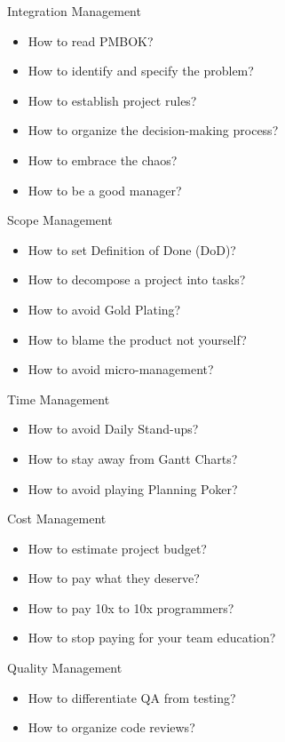 \documentclass[nobrand,anonymous,nodate,nosecurity]{huawei}
\begin{document}
{
\begin{lectures}
\item Integration Management
    \begin{itemize}
    \item How to read PMBOK?
    \item How to identify and specify the problem?
    \item How to establish project rules?
    \item How to organize the decision-making process?
    \item How to embrace the chaos?
    \item How to be a good manager?
    \end{itemize}
\item Scope Management
    \begin{itemize}
    \item How to set Definition of Done (DoD)?
    \item How to decompose a project into tasks?
    \item How to avoid Gold Plating?
    \item How to blame the product not yourself?
    \item How to avoid micro-management?
    \end{itemize}
\item Time Management
    \begin{itemize}
    \item How to avoid Daily Stand-ups?
    \item How to stay away from Gantt Charts?
    \item How to avoid playing Planning Poker?
    \end{itemize}
\item Cost Management
    \begin{itemize}
    \item How to estimate project budget?
    \item How to pay what they deserve?
    \item How to pay 10x to 10x programmers?
    \item How to stop paying for your team education?
    \end{itemize}
\item Quality Management
    \begin{itemize}
    \item How to differentiate QA from testing?
    \item How to organize code reviews?

\end{itemize}
\end{lectures}}
\end{document}
